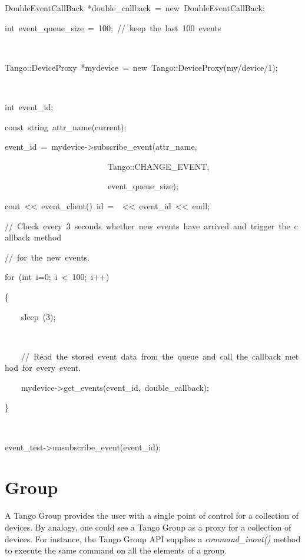 
\begin{lyxcode}
DoubleEventCallBack~{*}double\_callback~=~new~DoubleEventCallBack;

int~event\_queue\_size~=~100;~//~keep~the~last~100~events

~~~~~~

Tango::DeviceProxy~{*}mydevice~=~new~Tango::DeviceProxy(\textquotedbl{}my/device/1\textquotedbl{});

~

int~event\_id;

const~string~attr\_name(\textquotedbl{}current\textquotedbl{});

event\_id~=~mydevice->subscribe\_event(attr\_name,~

~~~~~~~~~~~~~~~~~~~~~~~~~Tango::CHANGE\_EVENT,

~~~~~~~~~~~~~~~~~~~~~~~~~event\_queue\_size);

cout~<\textcompwordmark{}<~\textquotedbl{}event\_client()~id~=~\textquotedbl{}~<\textcompwordmark{}<~event\_id~<\textcompwordmark{}<~endl;

//~Check~every~3~seconds~whether~new~events~have~arrived~and~trigger~the~callback~method~

//~for~the~new~events.

for~(int~i=0;~i~<~100;~i++)

\{

~~~~sleep~(3);~

~~~~

~~~~//~Read~the~stored~event~data~from~the~queue~and~call~the~callback~method~for~every~event.

~~~~mydevice->get\_events(event\_id,~double\_callback);

\}

~

event\_test->unsubscribe\_event(event\_id);
\end{lyxcode}


\section{Group}

A Tango Group provides the user with a single point of control for
a collection of devices. By analogy, one could see a Tango Group as
a proxy for a collection of devices. For instance, the Tango Group
API supplies a \emph{command\_inout()} method to execute the same
command on all the elements of a group. 

